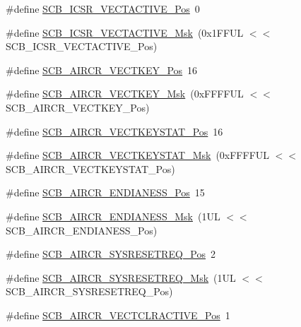 \begin{DoxyCompactItemize}
\item 
\#define \hyperlink{group___c_m_s_i_s___s_c_b_gae4f602c7c5c895d5fb687b71b0979fc3}{S\+C\+B\+\_\+\+I\+C\+S\+R\+\_\+\+V\+E\+C\+T\+A\+C\+T\+I\+V\+E\+\_\+\+Pos}~0
\item 
\#define \hyperlink{group___c_m_s_i_s___s_c_b_ga5533791a4ecf1b9301c883047b3e8396}{S\+C\+B\+\_\+\+I\+C\+S\+R\+\_\+\+V\+E\+C\+T\+A\+C\+T\+I\+V\+E\+\_\+\+Msk}~(0x1\+F\+F\+U\+L $<$$<$ S\+C\+B\+\_\+\+I\+C\+S\+R\+\_\+\+V\+E\+C\+T\+A\+C\+T\+I\+V\+E\+\_\+\+Pos)
\item 
\#define \hyperlink{group___c_m_s_i_s___s_c_b_gaaa27c0ba600bf82c3da08c748845b640}{S\+C\+B\+\_\+\+A\+I\+R\+C\+R\+\_\+\+V\+E\+C\+T\+K\+E\+Y\+\_\+\+Pos}~16
\item 
\#define \hyperlink{group___c_m_s_i_s___s_c_b_ga90c7cf0c490e7ae55f9503a7fda1dd22}{S\+C\+B\+\_\+\+A\+I\+R\+C\+R\+\_\+\+V\+E\+C\+T\+K\+E\+Y\+\_\+\+Msk}~(0x\+F\+F\+F\+F\+U\+L $<$$<$ S\+C\+B\+\_\+\+A\+I\+R\+C\+R\+\_\+\+V\+E\+C\+T\+K\+E\+Y\+\_\+\+Pos)
\item 
\#define \hyperlink{group___c_m_s_i_s___s_c_b_gaec404750ff5ca07f499a3c06b62051ef}{S\+C\+B\+\_\+\+A\+I\+R\+C\+R\+\_\+\+V\+E\+C\+T\+K\+E\+Y\+S\+T\+A\+T\+\_\+\+Pos}~16
\item 
\#define \hyperlink{group___c_m_s_i_s___s_c_b_gabacedaefeefc73d666bbe59ece904493}{S\+C\+B\+\_\+\+A\+I\+R\+C\+R\+\_\+\+V\+E\+C\+T\+K\+E\+Y\+S\+T\+A\+T\+\_\+\+Msk}~(0x\+F\+F\+F\+F\+U\+L $<$$<$ S\+C\+B\+\_\+\+A\+I\+R\+C\+R\+\_\+\+V\+E\+C\+T\+K\+E\+Y\+S\+T\+A\+T\+\_\+\+Pos)
\item 
\#define \hyperlink{group___c_m_s_i_s___s_c_b_gad31dec98fbc0d33ace63cb1f1a927923}{S\+C\+B\+\_\+\+A\+I\+R\+C\+R\+\_\+\+E\+N\+D\+I\+A\+N\+E\+S\+S\+\_\+\+Pos}~15
\item 
\#define \hyperlink{group___c_m_s_i_s___s_c_b_ga2f571f93d3d4a6eac9a3040756d3d951}{S\+C\+B\+\_\+\+A\+I\+R\+C\+R\+\_\+\+E\+N\+D\+I\+A\+N\+E\+S\+S\+\_\+\+Msk}~(1\+U\+L $<$$<$ S\+C\+B\+\_\+\+A\+I\+R\+C\+R\+\_\+\+E\+N\+D\+I\+A\+N\+E\+S\+S\+\_\+\+Pos)
\item 
\#define \hyperlink{group___c_m_s_i_s___s_c_b_gaffb2737eca1eac0fc1c282a76a40953c}{S\+C\+B\+\_\+\+A\+I\+R\+C\+R\+\_\+\+S\+Y\+S\+R\+E\+S\+E\+T\+R\+E\+Q\+\_\+\+Pos}~2
\item 
\#define \hyperlink{group___c_m_s_i_s___s_c_b_gaae1181119559a5bd36e62afa373fa720}{S\+C\+B\+\_\+\+A\+I\+R\+C\+R\+\_\+\+S\+Y\+S\+R\+E\+S\+E\+T\+R\+E\+Q\+\_\+\+Msk}~(1\+U\+L $<$$<$ S\+C\+B\+\_\+\+A\+I\+R\+C\+R\+\_\+\+S\+Y\+S\+R\+E\+S\+E\+T\+R\+E\+Q\+\_\+\+Pos)
\item 
\#define \hyperlink{group___c_m_s_i_s___s_c_b_gaa30a12e892bb696e61626d71359a9029}{S\+C\+B\+\_\+\+A\+I\+R\+C\+R\+\_\+\+V\+E\+C\+T\+C\+L\+R\+A\+C\+T\+I\+V\+E\+\_\+\+Pos}~1
$$
\end{DoxyCompactItemize}
